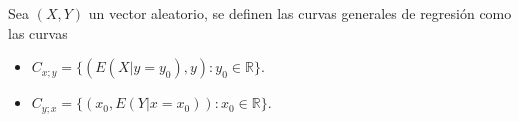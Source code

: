 \begin{defi}
    Sea $(X,Y)$ un vector aleatorio, se definen las curvas generales de regresión como las curvas
    \begin{itemize}
        \item $C_{x;y} = \{ (E(X | y = y_0), y) : y_0 \in \mathbb{R} \}$.
        \item $C_{y;x} = \{ (x_0, E(Y | x = x_0)) : x_0 \in \mathbb{R} \}$.
    \end{itemize}
\end{defi}